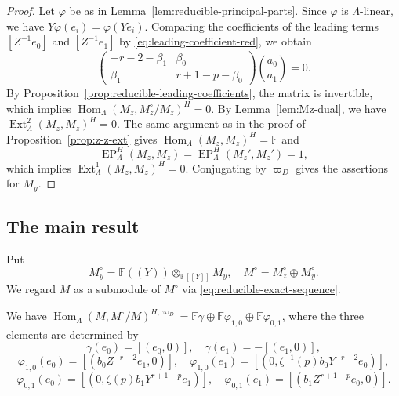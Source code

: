 \documentclass[11pt,a4paper]{article} %
\def\FF{\mathbb{F}}
\def\EP{\operatorname{EP}}
\def\Ext{\operatorname{Ext}} %
\def\Hom{\operatorname{Hom}}
\begin{document}
\begin{proof}
Let $\varphi$ be as in Lemma~\ref{lem:reducible-principal-parts}. Since $\varphi$ is $\Lambda$-linear, we have $Y\varphi(e_i)=\varphi(Ye_i)$. Comparing the coefficients of the leading terms $[Z^{-1}e_0]$ and $[Z^{-1}e_1]$ by \eqref{eq:leading-coefficient-red}, we obtain
\[
\begin{pmatrix}
-r-2-\beta_1&\beta_0\\
\beta_1&r+1-p-\beta_0
\end{pmatrix}
\binom{a_0}{a_1}=0.
\]
By Proposition~\ref{prop:reducible-leading-coefficients}, the matrix is invertible, which implies $\Hom_\Lambda(M_z,M_z^\circ/M_z)^H=0$. By Lemma~\ref{lem:Mz-dual}, we have $\Ext^2_\Lambda(M_z,M_z)^H=0$. The same argument as in the proof of Proposition~\ref{prop:z-z-ext} gives $\Hom_\Lambda(M_z,M_z)^H=\FF$ and 
\[
\EP_\Lambda^H(M_z,M_z)=\EP_\Lambda^H(M_z',M_z')=1,
\]
which implies $\Ext^1_\Lambda(M_z,M_z)^H=0$.
Conjugating by $\varpi_D$ gives the assertions for $M_y$.
\end{proof}

\subsection{The main result}

Put 
\[
M_y^\circ=\FF((Y))\otimes_{\FF[[Y]]}M_y,\quad M^\circ=M_z^\circ\oplus M_y^\circ.
\]
We regard $M$ as a submodule of $M^\circ$ via \eqref{eq:reducible-exact-sequence}. 

\begin{proposition}\label{prop:reducible-Hom-explicit}
    We have $\Hom_\Lambda(M,M^\circ/M)^{H,\varpi_D}
=\FF\gamma\oplus\FF\varphi_{1,0}\oplus\FF\varphi_{0,1}$, where the three elements are determined by
\[
\gamma(e_0)=[(e_0,0)],\quad
\gamma(e_1)=-[(e_1,0)],
\]
\[
\varphi_{1,0}(e_0)
=\left[(b_0Z^{-r-2}e_1,
0)\right],\quad
\varphi_{1,0}(e_1)
=\left[\left(0,\zeta^{-1}(p)b_0Y^{-r-2}e_0\right)\right],
\]
\[
\varphi_{0,1}(e_0)
=\left[\left(0,\zeta(p)b_1Y^{r+1-p}e_1\right)\right],\quad
\varphi_{0,1}(e_1)
=\left[(b_1Z^{r+1-p}e_0,0)\right].
\]
\end{proposition}
\end{document}
